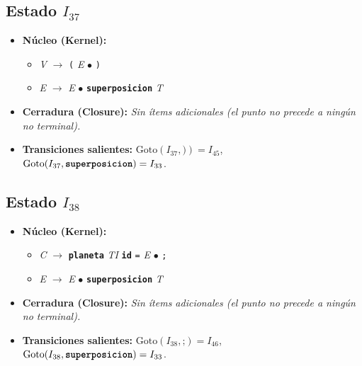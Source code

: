 \documentclass[12pt, letterpaper]{article}
\begin{document}
\subsection*{Estado $I_{37}$ }
\begin{itemize}\setlength{\itemsep}{1pt}\setlength{\parskip}{0pt}
\item \textbf{Núcleo (Kernel):}
\begin{itemize}\setlength{\itemsep}{1pt}\setlength{\parskip}{0pt}
    \item \textit{V} $\to$ \texttt{(} \textit{E} $\bullet$ \texttt{)}
    \item \textit{E} $\to$ \textit{E} $\bullet$ \textbf{\texttt{superposicion}} \textit{T}
\end{itemize}
\item \textbf{Cerradura (Closure):} \emph{Sin ítems adicionales (el punto no precede a ningún no terminal).}
\item \textbf{Transiciones salientes:} $\text{Goto}(I_{37}, \texttt{)}) = I_{45}$, \quad $\text{Goto}(I_{37}, \textbf{\texttt{superposicion}}) = I_{33}$.
\end{itemize}
\vspace{2pt}
\subsection*{Estado $I_{38}$ }
\begin{itemize}\setlength{\itemsep}{1pt}\setlength{\parskip}{0pt}
\item \textbf{Núcleo (Kernel):}
\begin{itemize}\setlength{\itemsep}{1pt}\setlength{\parskip}{0pt}
    \item \textit{C} $\to$ \textbf{\texttt{planeta}} \textit{TI} \textbf{\texttt{id}} \texttt{=} \textit{E} $\bullet$ \texttt{;}
    \item \textit{E} $\to$ \textit{E} $\bullet$ \textbf{\texttt{superposicion}} \textit{T}
\end{itemize}
\item \textbf{Cerradura (Closure):} \emph{Sin ítems adicionales (el punto no precede a ningún no terminal).}
\item \textbf{Transiciones salientes:} $\text{Goto}(I_{38}, \texttt{;}) = I_{46}$, \quad $\text{Goto}(I_{38}, \textbf{\texttt{superposicion}}) = I_{33}$.
\end{itemize}
\vspace{2pt}
\end{document}
